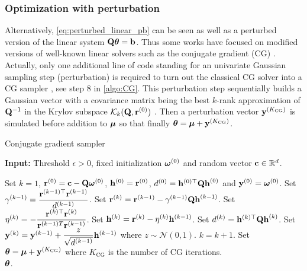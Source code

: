 \documentclass[nohypdvips,onefignum,onetabnum]{siamart171218}
\begin{document}
\subsubsection{Optimization with perturbation}
Alternatively, \cref{eq:perturbed_linear_pb} can be seen as well as a perturbed version of the linear system $\mathbf{Q}\boldsymbol{\theta} = \mathbf{b}$.
Thus some works have focused on modified versions of well-known linear solvers such as the conjugate gradient (CG) \cite{Rue2001,Schneider2003,Parker2012}.
Actually, only one additional line of code standing for an univariate Gaussian sampling step (perturbation) is required to turn out the classical CG solver into a CG sampler \cite{Schneider2003,Parker2012}, see step 8 in  \cref{algo:CG}. 
This perturbation step sequentially builds a Gaussian vector with a covariance matrix being the best $k$-rank approximation of $\mathbf{Q}^{-1}$ in the Krylov subspace $\mathcal{K}_k(\mathbf{Q},\mathbf{r}^{(0)})$ \cite{Parker2012}. Then a perturbation vector $\mathbf{y}^{(K_{\mathrm{CG}})}$ is simulated before addition to $\boldsymbol{\mu}$ so that finally $\boldsymbol{\theta} = \boldsymbol{\mu} + \mathbf{y}^{(K_{\mathrm{CG}})}$. 
%
\begin{algorithm}
\caption{Conjugate gradient sampler}
\label{algo:CG}
\hspace*{\algorithmicindent} \textbf{Input:} Threshold $\epsilon > 0$, fixed initialization $\boldsymbol{\omega}^{(0)}$ and random vector $\mathbf{c} \in \mathbb{R}^d$.
\begin{algorithmic}[1]
  \State Set $k=1$, $\mathbf{r}^{(0)} = \mathbf{c} - \mathbf{Q}\boldsymbol{\omega}^{(0)}$, $\mathbf{h}^{(0)} = \mathbf{r}^{(0)}$, $d^{(0)} = \mathbf{h}^{(0)\top}\mathbf{Qh}^{(0)}$ and $\mathbf{y}^{(0)} = \boldsymbol{\omega}^{(0)}$. 
    \State Set $\gamma^{(k-1)} = \dfrac{\mathbf{r}^{(k-1)\top}\mathbf{r}^{(k-1)}}{d^{(k-1)}}$.
    \State Set $\mathbf{r}^{(k)} = \mathbf{r}^{(k-1)} - \gamma^{(k-1)}\mathbf{Qh}^{(k-1)}$.
    \State Set $\eta^{(k)} = -\dfrac{\mathbf{r}^{(k)\top}\mathbf{r}^{(k)}}{\mathbf{r}^{(k-1)T}\mathbf{r}^{(k-1)}}$.
    \State Set $\mathbf{h}^{(k)} = \mathbf{r}^{(k)} - \eta^{(k)}\mathbf{h}^{(k-1)}$.
    \State Set $d^{(k)} = \mathbf{h}^{(k)\top}\mathbf{Qh}^{(k)}$.
      \State Set $\mathbf{y}^{(k)} = \mathbf{y}^{(k-1)} + \dfrac{z}{\sqrt{d^{(k-1)}}}\mathbf{h}^{(k-1)}$ where $z \sim \mathcal{N}(0,1)$.
    \State $k = k + 1$.
  \EndWhile
  \State Set $\boldsymbol{\theta} = \boldsymbol{\mu} + \mathbf{y}^{(K_{\mathrm{CG}})}$ where $K_{\mathrm{CG}}$ is the number of CG iterations.\\
\Return $\boldsymbol{\theta}$.


\end{algorithmic}
\end{algorithm}
\end{document}
